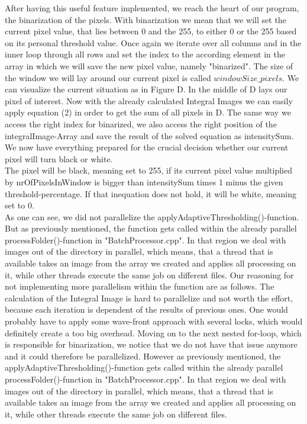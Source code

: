 \documentclass[sigconf]{acmart}
\begin{document}
After having this useful feature implemented, we reach the heart of our program, the binarization of the pixels. With binarization we mean that we will set the current pixel value, that lies between 0 and the 255, to either 0 or the 255 based on its personal threshold value. Once again we iterate over all columns and in the inner loop through all rows and set the index to the according element in the array in which we will save the new pixel value, namely "binarized".  The size of the window we will lay around our current pixel is called $windowSize\_pixels$. We can visualize the current situation as in Figure D. In the middle of D lays our pixel of interest. Now with the already calculated Integral Images we can easily apply equation (2) in order to get the sum of all pixels in D. The same way we access the right index for binarized, we also access the right position of the integralImage-Array and save the result of the solved equation as intensitySum.\\
We now have everything prepared for the crucial decision whether our current pixel will turn black or white. \\

The pixel will be black, meaning set to 255, if its current pixel value multiplied by nrOfPixelsInWindow is bigger than intensitySum times 1 minus the given threshold-percentage. If that inequation does not hold, it will be white, meaning set to 0.\\

As one can see, we did not parallelize the applyAdaptiveThresholding()-function. But as previously mentioned, the function gets called within the already parallel processFolder()-function in "BatchProcessor.cpp". In that region we deal with images out of the directory in parallel, which means, that a thread that is available takes an image from the array we created and applies all processing on it, while other threads execute the same job on different files. Our reasoning for not implementing more parallelism within the function are as follows. The calculation of the Integral Image is hard to parallelize and not worth the effort, because each iteration is dependent of the results of previous ones. One would probably have to apply some wave-front approach with several locks, which would definitely create a too big overhead. Moving on to the next nested for-loop, which is responsible for binarization, we notice that we do not have that issue anymore and it could therefore be parallelized. However as previously mentioned, the applyAdaptiveThresholding()-function gets called within the already parallel processFolder()-function in "BatchProcessor.cpp". In that region we deal with images out of the directory in parallel, which means, that a thread that is available takes an image from the array we created and applies all processing on it, while other threads execute the same job on different files. 
\end{document}
